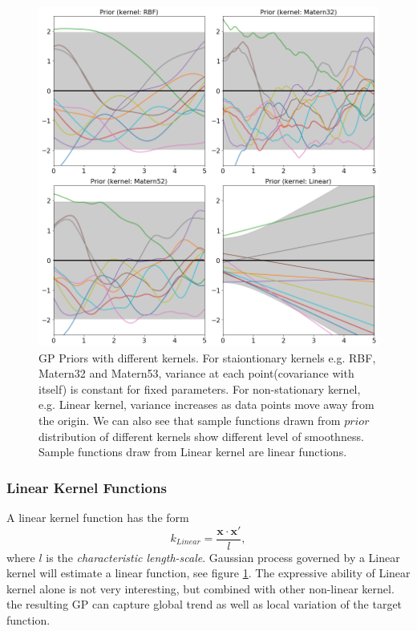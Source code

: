 \documentclass[11pt,a4paper]{article}
\theoremstyle{definition}
\numberwithin{equation}{section}
\let\vec\mathbf
\begin{document}
	\begin{figure}[t!]
		\centering
		\includegraphics[width=.9\linewidth]{prior_diff_kernels.png}
		\caption{GP Priors with different kernels. For staiontionary kernels e.g. RBF, Matern32 and Matern53, variance at each point(covariance with itself) is constant for fixed parameters. For non-stationary kernel, e.g. Linear kernel, variance increases as data points move away from the origin. We can also see that sample functions drawn from $prior$ distribution of different kernels show different level of smoothness. Sample functions draw from Linear kernel are linear functions.}
		\label{fig:gp_diff_kernels}
	\end{figure}
	
	\subsubsection*{Linear Kernel Functions}
	A linear kernel function has the form
	\begin{equation}
	k_{Linear} = \frac{\vec x \cdot \vec x'}{l},
	\end{equation}
	where $l$ is the \textit{characteristic length-scale}. Gaussian process governed by a Linear kernel will estimate a linear function, see figure \ref{fig:gp_diff_kernels}. The expressive ability of Linear kernel alone is not very interesting, but combined with other non-linear kernel. the resulting GP can capture global trend as well as local variation of the target function. 
	
\end{document}
